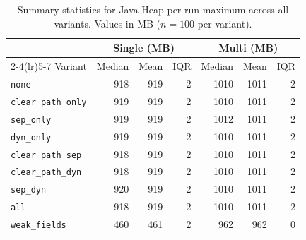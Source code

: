 \begin{table}[t]
\centering
\caption{Summary statistics for Java Heap per-run maximum across all variants. Values in MB ($n=100$ per variant).}
\label{tab:stats-memory-java-heap}
\begin{tabular}{l rrr rrr}
\toprule
 & \multicolumn{3}{c}{Single (MB)} & \multicolumn{3}{c}{Multi (MB)} \\
\cmidrule(lr){2-4}\cmidrule(lr){5-7}
Variant & Median & Mean & IQR & Median & Mean & IQR \\
\midrule
\texttt{none} & 918 & 919 & 2 & 1010 & 1011 & 2 \\
\texttt{clear\_path\_only} & 919 & 919 & 2 & 1010 & 1011 & 2 \\
\texttt{sep\_only} & 919 & 919 & 2 & 1012 & 1011 & 2 \\
\texttt{dyn\_only} & 919 & 919 & 2 & 1010 & 1011 & 2 \\
\texttt{clear\_path\_sep} & 918 & 919 & 2 & 1010 & 1011 & 2 \\
\texttt{clear\_path\_dyn} & 918 & 919 & 2 & 1010 & 1011 & 2 \\
\texttt{sep\_dyn} & 920 & 919 & 2 & 1010 & 1011 & 2 \\
\texttt{all} & 918 & 919 & 2 & 1010 & 1011 & 2 \\
\texttt{weak\_fields} & 460 & 461 & 2 & 962 & 962 & 0 \\
\bottomrule
\end{tabular}
\end{table}
